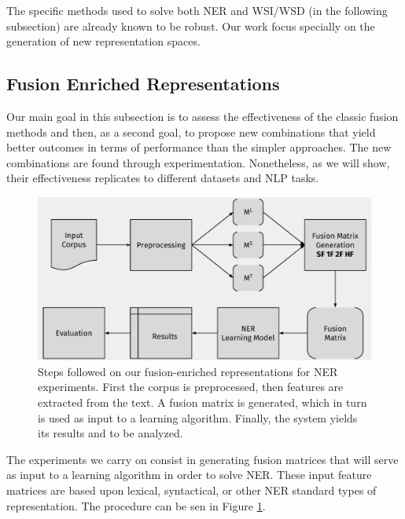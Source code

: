 The specific methods used to solve both NER and WSI/WSD (in the following subsection) are already known to be robust. Our work focus specially on the generation of new representation spaces.

\subsection{Fusion Enriched Representations}
\label{chap6:application}
 Our main goal in this subsection is to assess the effectiveness of the classic fusion methods and then, as a second goal, to propose new combinations that yield better outcomes in terms of performance than the simpler approaches. The new combinations are found through experimentation. Nonetheless, as we will show, their effectiveness replicates to different datasets and NLP tasks. 





\begin{figure}[t]
\centering
\includegraphics[width=0.85\linewidth]{images/Chapitre4/diag_metodoNER.pdf}
\caption{Steps followed on our fusion-enriched representations for NER  experiments. First the corpus is preprocessed, then features are extracted from the text. A fusion matrix is generated, which in turn is used as input to a learning algorithm. Finally, the system yields its results and to be analyzed.}
\label{fig:diagmetodo}
\end{figure}

The experiments we carry on consist in generating fusion matrices that will serve as input to a learning algorithm in order to solve NER. These input feature matrices are based upon lexical, syntactical, or other NER standard types of representation. The procedure can be sen in Figure \ref{fig:diagmetodo}.

